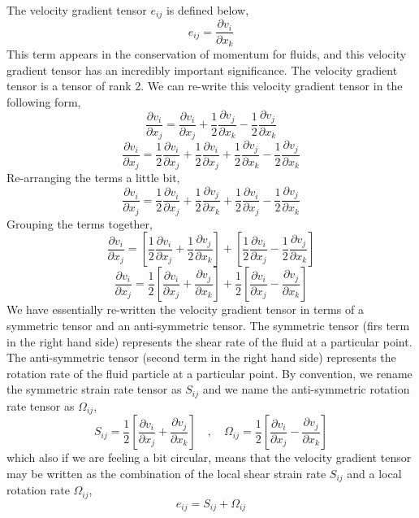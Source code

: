 
The velocity gradient tensor $e_{ij}$ is defined below,
$$e_{ij} = \frac{\partial v_{i}}{\partial x_{k}}$$
This term appears in the conservation of momentum for fluids, and this velocity gradient tensor has an incredibly important significance.
The velocity gradient tensor is a tensor of rank 2.
We can re-write this velocity gradient tensor in the following form,
$$\frac{\partial v_{i}}{\partial x_{j}} = \frac{\partial v_{i}}{\partial x_{j}} + \frac{1}{2}\frac{\partial v_{j}}{\partial x_{k}} - \frac{1}{2}\frac{\partial v_{j}}{\partial x_{k}}$$
$$\frac{\partial v_{i}}{\partial x_{j}} = \frac{1}{2}\frac{\partial v_{i}}{\partial x_{j}} + \frac{1}{2}\frac{\partial v_{i}}{\partial x_{j}} + \frac{1}{2}\frac{\partial v_{j}}{\partial x_{k}} - \frac{1}{2}\frac{\partial v_{j}}{\partial x_{k}}$$
Re-arranging the terms a little bit,
$$\frac{\partial v_{i}}{\partial x_{j}} = \frac{1}{2}\frac{\partial v_{i}}{\partial x_{j}} + \frac{1}{2}\frac{\partial v_{j}}{\partial x_{k}} + \frac{1}{2}\frac{\partial v_{i}}{\partial x_{j}} - \frac{1}{2}\frac{\partial v_{j}}{\partial x_{k}}$$
Grouping the terms together,
$$\frac{\partial v_{i}}{\partial x_{j}} = \left[\frac{1}{2}\frac{\partial v_{i}}{\partial x_{j}} + \frac{1}{2}\frac{\partial v_{j}}{\partial x_{k}}\right] + \left[\frac{1}{2}\frac{\partial v_{i}}{\partial x_{j}} - \frac{1}{2}\frac{\partial v_{j}}{\partial x_{k}}\right]$$
\begin{equation}\frac{\partial v_{i}}{\partial x_{j}} = \frac{1}{2}\left[\frac{\partial v_{i}}{\partial x_{j}} + \frac{\partial v_{j}}{\partial x_{k}}\right] + \frac{1}{2}\left[\frac{\partial v_{i}}{\partial x_{j}} - \frac{\partial v_{j}}{\partial x_{k}}\right] \label{raw decomposition of velocity gradient tensor Rotation and Shear}\end{equation}
We have essentially re-written the velocity gradient tensor in terms of a symmetric tensor and an anti-symmetric tensor. 
The symmetric tensor (firs term in the right hand side) represents the shear rate of the fluid at a particular point.
The anti-symmetric tensor (second term in the right hand side) represents the rotation rate of the fluid particle at a particular point.
By convention, we rename the symmetric strain rate tensor as $S_{ij}$ and we name the anti-symmetric rotation rate tensor as $\Omega_{ij}$,
$$S_{ij} = \frac{1}{2}\left[\frac{\partial v_{i}}{\partial x_{j}} + \frac{\partial v_{j}}{\partial x_{k}}\right] \quad,\quad \Omega_{ij} = \frac{1}{2}\left[\frac{\partial v_{i}}{\partial x_{j}} - \frac{\partial v_{j}}{\partial x_{k}}\right]$$
which also if we are feeling a bit circular, means that the velocity gradient tensor may be written as the combination of the local shear strain rate $S_{ij}$ and a local rotation rate $\Omega_{ij}$,
$$e_{ij} = S_{ij} + \Omega_{ij}$$


